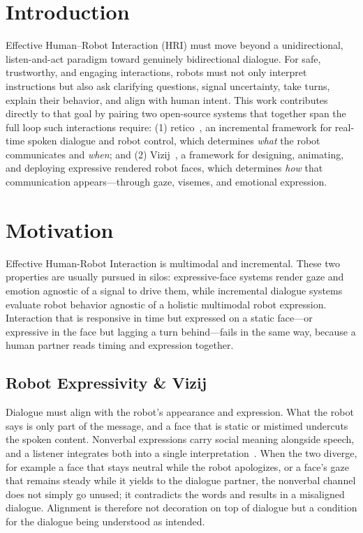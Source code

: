 \documentclass[conference]{IEEEtran}
\begin{document}
\section{Introduction}

Effective Human–Robot Interaction (HRI) must move beyond a unidirectional, listen-and-act paradigm toward genuinely bidirectional dialogue. For safe, trustworthy, and engaging interactions, robots must not only interpret instructions but also ask clarifying questions, signal uncertainty, take turns, explain their behavior, and align with human intent. This work contributes directly to that goal by pairing two open-source systems that together span the full loop such interactions require: (1) retico~\cite{michael2020retico}, an incremental framework for real-time spoken dialogue and robot control, which determines \textit{what} the robot communicates and \textit{when}; and (2) Vizij~\cite{elbeleidy2026vizij,elbeleidy2026tutorial}, a framework for designing, animating, and deploying expressive rendered robot faces, which determines \textit{how} that communication appears—through gaze, visemes, and emotional expression.

\section{Motivation}

Effective Human-Robot Interaction is multimodal and incremental. These two
properties are usually pursued in silos: expressive-face systems render
gaze and emotion agnostic of a signal to drive them, while
incremental dialogue systems evaluate robot behavior agnostic of a holistic multimodal robot expression. Interaction that is responsive in time but expressed on a static face---or expressive in the face but lagging a turn behind---fails in the
same way, because a human partner reads timing and expression together.

\subsection{Robot Expressivity \& Vizij}

Dialogue must align with the robot's appearance and expression. What the
robot says is only part of the message, and a face that is static or mistimed
undercuts the spoken content. Nonverbal expressions carry social meaning
alongside speech, and a listener integrates both into a single
interpretation~\cite{urakami2023nonverbal, admoni2017social}. When the two
diverge, for example a face that stays neutral while the robot apologizes, or a face's gaze that remains steady while it yields to the dialogue partner, the nonverbal channel does not simply go unused; it contradicts the words and results in a misaligned dialogue. Alignment is therefore not decoration on top of dialogue but a condition for the dialogue being understood as intended.
\end{document}
